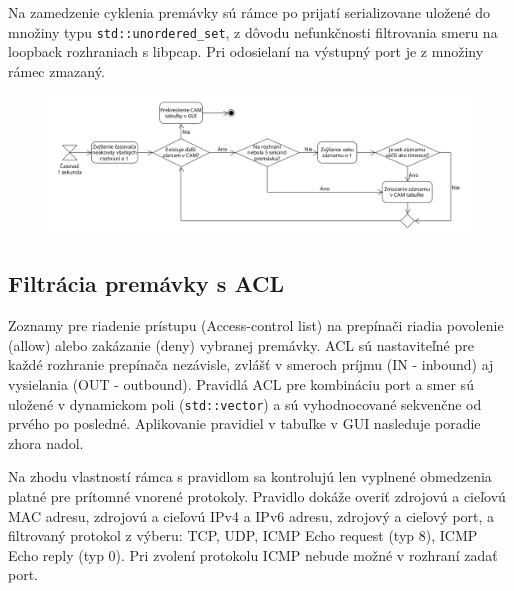 \documentclass[12pt, a4paper]{article}
\begin{document}
Na zamedzenie cyklenia premávky sú rámce po prijatí serializovane uložené do množiny typu \verb|std::unordered_set|, z dôvodu 
nefunkčnosti filtrovania smeru na loopback rozhraniach s libpcap. Pri odosielaní na výstupný port je z množiny rámec zmazaný.

\begin{figure}[h!]
	\centering
	\includegraphics[width=\textwidth]{assets/mac-table.png}
\end{figure}

\subsection{Filtrácia premávky s ACL}
Zoznamy pre riadenie prístupu (Access-control list) na prepínači riadia povolenie (allow) alebo zakázanie (deny) vybranej premávky.
ACL sú nastaviteľné pre každé rozhranie prepínača nezávisle, zvlášť v smeroch príjmu (IN - inbound) aj vysielania (OUT - outbound). 
Pravidlá ACL pre kombináciu port a smer sú uložené v dynamickom poli (\verb|std::vector|) a sú vyhodnocované sekvenčne od prvého po 
posledné. Aplikovanie pravidiel v tabuľke v GUI nasleduje poradie zhora nadol.

Na zhodu vlastností rámca s pravidlom sa kontrolujú len vyplnené obmedzenia platné pre prítomné vnorené protokoly.
Pravidlo dokáže overiť zdrojovú a cieľovú MAC adresu, zdrojovú a cieľovú IPv4 a IPv6 adresu, zdrojový a cieľový
port, a filtrovaný protokol z výberu: TCP, UDP, ICMP Echo request (typ 8), ICMP Echo reply (typ 0). Pri zvolení protokolu 
ICMP nebude možné v rozhraní zadať port.
\end{document}
